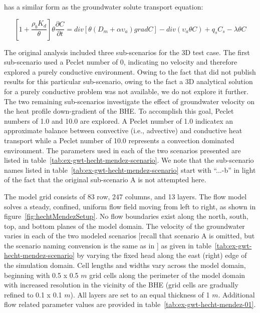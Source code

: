 has a similar form as the groundwater solute transport equation:

\begin{equation*}
\left[ 1 + \frac{\rho_b K_d}{\theta} \right] \theta \frac{\partial  C}{\partial t}
= div \left[ \theta \left( D_m + \alpha \upsilon_a \right) grad C \right] - div \left( \upsilon_a \theta C \right) + q_s C_s - \lambda \theta C
\end{equation*}

The original analysis included three sub-scenarios for the 3D test case.  The first sub-scenario used a Peclet number of 0, indicating no velocity and therefore explored a purely conductive environment.  Owing to the fact that \citep{hechtMendez2010} did not publish results for this particular sub-scenario, owing to the fact a 3D analytical solution for a purely conductive problem was not available, we do not explore it further.  The two remaining sub-scenarios investigate the effect of groundwater velocity on the heat profile down-gradient of the BHE.  To accomplish this goal, Peclet numbers of 1.0 and 10.0 are explored. A Peclet number of 1.0 indicatex an approximate balance between convective (i.e., advective) and conductive heat transport while a Peclet number of 10.0 represents a convection dominated environment.  The parameters used in each of the two scenarios presented are listed in table~\ref{tab:ex-gwt-hecht-mendez-scenario}.  We note that the sub-scenario names listed in table~\ref{tab:ex-gwt-hecht-mendez-scenario} start with ``...-b'' in light of the fact that the original sub-scenario A is not attempted here.



The model grid consists of 83 row, 247 columns, and 13 layers.  The flow model solves a steady, confined, uniform flow field moving from left to right, as shown in figure~\ref{fig:hechtMendezSetup}. No flow boundaries exist along the north, south, top, and bottom planes of the model domain.  The velocity of the groundwater varies in each of the two modeled scenarios [recall that scenario A is omitted, but the scenario naming convension is the same as in \cite{hechtMendez2010}] as given in table~\ref{tab:ex-gwt-hecht-mendez-scenario} by varying the fixed head along the east (right) edge of the simulation domain.  Cell lengths and widths vary across the model domain, beginning with 0.5 x 0.5 $m$ grid cells along the perimeter of the model domain with increased resolution in the vicinity of the BHE (grid cells are gradually refined to 0.1 x 0.1 $m$).  All layers are set to an equal thickness of 1 $m$.  Additional flow related parameter values are provided in table~\ref{tab:ex-gwt-hecht-mendez-01}.  

